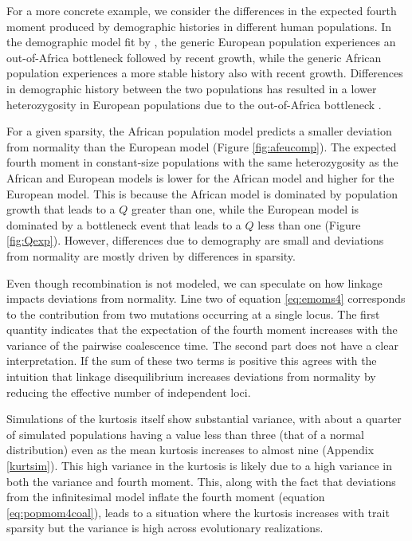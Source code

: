 For a more concrete example, we consider the differences in the expected fourth
moment produced by demographic histories in different human populations. In the
demographic model fit by \citet{Tennessen2012}, the generic European population
experiences an out-of-Africa bottleneck followed by recent growth, while the
generic African population experiences a more stable history also with recent
growth. Differences in demographic history between the two populations has
resulted in a lower heterozygosity in European populations due to the
out-of-Africa bottleneck \citep{Yu2002}.

For a given sparsity, the African population model predicts a smaller deviation
from normality than the European model (Figure \ref{fig:afeucomp}). The expected
fourth moment in constant-size populations with the same heterozygosity as the
African and European models is lower for the African model and higher for the
European model. This is because the African model is dominated by population
growth that leads to a $Q$ greater than one, while the European model is
dominated by a bottleneck event that leads to a $Q$ less than one (Figure
\ref{fig:Qexp}). However, differences due to demography are small and deviations
from normality are mostly driven by differences in sparsity.

Even though recombination is not modeled, we can speculate on how linkage
impacts deviations from normality. Line two of equation \eqref{eq:emoms4}
corresponds to the contribution from two mutations occurring at a single locus.
The first quantity indicates that the expectation of the fourth moment increases
with the variance of the pairwise coalescence time. The second part does not
have a clear interpretation. If the sum of these two terms is positive this
agrees with the intuition that linkage disequilibrium increases deviations from
normality by reducing the effective number of independent loci.

Simulations of the kurtosis itself show substantial variance, with about a
quarter of simulated populations having a value less than three (that of a
normal distribution) even as the mean kurtosis increases to almost nine
(Appendix \ref{kurtsim}). This high variance in the kurtosis is likely due to a
high variance in both the variance and fourth moment. This, along with the fact
that deviations from the infinitesimal model inflate the fourth moment
(equation \eqref{eq:popmom4coal}), leads to a situation where the kurtosis
increases with trait sparsity but the variance is high across evolutionary
realizations.
